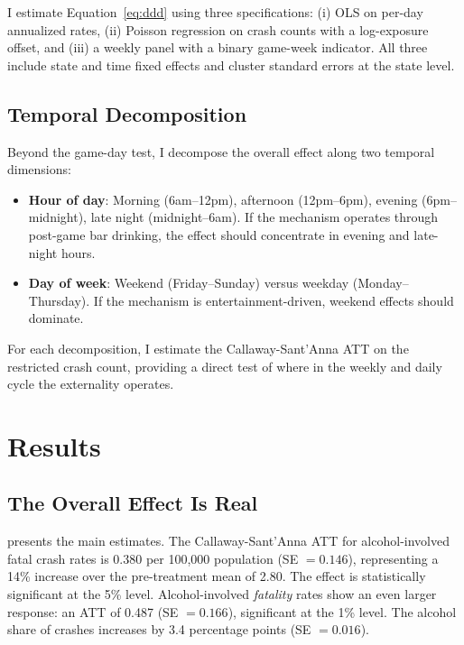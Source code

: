 \documentclass[12pt]{article}
\begin{document}
I estimate Equation~\ref{eq:ddd} using three specifications: (i) OLS on per-day annualized rates, (ii) Poisson regression on crash counts with a log-exposure offset, and (iii) a weekly panel with a binary game-week indicator. All three include state and time fixed effects and cluster standard errors at the state level.

\subsection{Temporal Decomposition}

Beyond the game-day test, I decompose the overall effect along two temporal dimensions:
\begin{itemize}
  \item \textbf{Hour of day}: Morning (6am--12pm), afternoon (12pm--6pm), evening (6pm--midnight), late night (midnight--6am). If the mechanism operates through post-game bar drinking, the effect should concentrate in evening and late-night hours.
  \item \textbf{Day of week}: Weekend (Friday--Sunday) versus weekday (Monday--Thursday). If the mechanism is entertainment-driven, weekend effects should dominate.
\end{itemize}

For each decomposition, I estimate the Callaway-Sant'Anna ATT on the restricted crash count, providing a direct test of where in the weekly and daily cycle the externality operates.


\section{Results}

\subsection{The Overall Effect Is Real}



 presents the main estimates. The Callaway-Sant'Anna ATT for alcohol-involved fatal crash rates is 0.380 per 100,000 population (SE $= 0.146$), representing a 14\% increase over the pre-treatment mean of 2.80. The effect is statistically significant at the 5\% level. Alcohol-involved \textit{fatality} rates show an even larger response: an ATT of 0.487 (SE $= 0.166$), significant at the 1\% level. The alcohol share of crashes increases by 3.4 percentage points (SE $= 0.016$).
\end{document}
